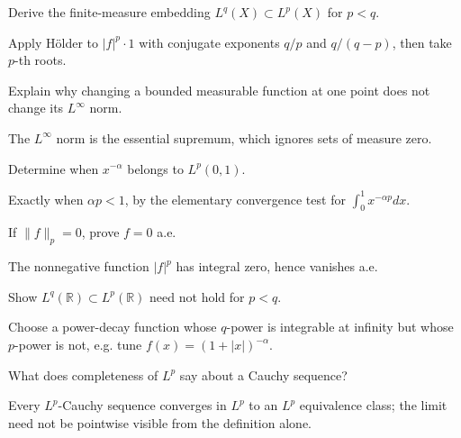 \begin{problem}\label{prob:iii06-problem-02}
Derive the finite-measure embedding \(L^q(X)\subset L^p(X)\) for \(p<q\).
\end{problem}
\begin{solution}
Apply Hölder to \(|f|^p\cdot1\) with conjugate exponents \(q/p\) and
\(q/(q-p)\), then take \(p\)-th roots.
\end{solution}

\begin{problem}\label{prob:iii06-problem-03}
Explain why changing a bounded measurable function at one point does not change its \(L^\infty\) norm.
\end{problem}
\begin{solution}
The \(L^\infty\) norm is the essential supremum, which ignores sets of
measure zero.
\end{solution}

\begin{problem}\label{prob:iii06-problem-04}
Determine when \(x^{-\alpha}\) belongs to \(L^p(0,1)\).
\end{problem}
\begin{solution}
Exactly when \(\alpha p<1\), by the elementary convergence test for
\(\int_0^1x^{-\alpha p}dx\).
\end{solution}

\begin{problem}\label{prob:iii06-problem-05}
If \(\|f\|_p=0\), prove \(f=0\) a.e.
\end{problem}
\begin{solution}
The nonnegative function \(|f|^p\) has integral zero, hence vanishes a.e.
\end{solution}

\begin{problem}\label{prob:iii06-problem-06}
Show \(L^q(\mathbb R)\subset L^p(\mathbb R)\) need not hold for \(p<q\).
\end{problem}
\begin{solution}
Choose a power-decay function whose \(q\)-power is integrable at infinity
but whose \(p\)-power is not, e.g. tune \(f(x)=(1+|x|)^{-\alpha}\).
\end{solution}

\begin{problem}\label{prob:iii06-problem-07}
What does completeness of \(L^p\) say about a Cauchy sequence?
\end{problem}
\begin{solution}
Every \(L^p\)-Cauchy sequence converges in \(L^p\) to an \(L^p\) equivalence
class; the limit need not be pointwise visible from the definition alone.
\end{solution}


